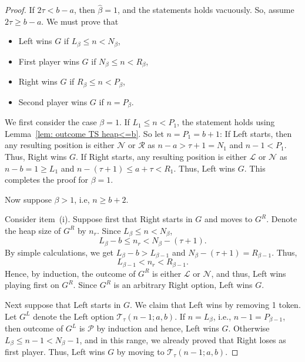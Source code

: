 \documentclass[oneside,reqno]{amsart}
\newcommand{\ts}{\mathcal{T}}
\newcommand{\lp}{\mathscr{L}}
\newcommand{\rp}{\mathscr{R}}
\newcommand{\np}{\mathscr{N}}
\newcommand{\pp}{\mathscr{P}}
\newcommand{\hbeta}{\widehat\beta}
\begin{document}
\begin{proof}
    If $2\tau<b-a$, then $\hbeta=1$, and the statements holds vacuously. So, assume $2\tau\ge b-a$. We must prove that
    \begin{itemize}
        \item[(i)] Left wins $G$ if $L_\beta\le n< N_\beta$,
        \item[(ii)] First player wins $G$ if $N_\beta\le n< R_\beta$,
        \item[(iii)] Right wins $G$ if $R_\beta\le n< P_\beta$,
        \item[(iv)] Second player wins $G$ if $n=P_\beta$.
    \end{itemize}

    We first consider the case $\beta=1$. If $L_1\le n<P_1$, the statement holds using Lemma~\ref{lem: outcome TS heap<=b}. So let $n=P_1=b+1$: If Left starts, then any resulting position is either $\np$ or $\rp$ as $n-a>\tau+1=N_1$ and $n-1<P_1$. Thus, Right wins $G$. If Right starts, any resulting position is either $\lp$ or $\np$ as $n-b=1\ge L_1$ and $n-(\tau+1)\le a+\tau<R_1$. Thus, Left wins $G$. This completes the proof for $\beta=1$. 
    
    Now suppose $\beta>1$, i.e, $n\ge b+2$.

    
    Consider item~(i).  Suppose first that Right starts in $G$ and moves to $G^R$. Denote the heap size of $G^R$ by $n_r$. Since $L_\beta\le n< N_\beta$, $$L_\beta-b\le n_r<N_\beta-(\tau+1).$$ By simple calculations, we get $L_\beta-b>L_{\beta-1}$ and $N_\beta-(\tau+1)=R_{\beta-1}$. Thus, $$L_{\beta-1}<n_r< R_{\beta-1}.$$ Hence, by induction, the outcome of $G^R$ is either $\lp$ or $\np$, and thus, Left wins playing first on $G^R$. Since $G^R$ is an arbitrary Right option, Left wins $G$. 
    
    Next suppose that Left starts in $G$. We claim that Left wins by removing 1 token. Let $G^L$ denote the Left option $\ts_\tau(n-1;a,b)$. If $n=L_\beta$, i.e., $n-1=P_{\beta-1}$, then outcome of $G^L$ is $\pp$ by induction and hence, Left wins $G$. Otherwise $L_\beta\le n-1< N_\beta-1$, and in this range, we already proved that Right loses as first player. Thus, Left wins $G$ by moving to $\ts_\tau(n-1;a,b)$.
    

\end{proof}
\end{document}
